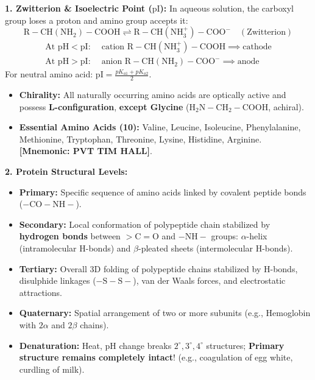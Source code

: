 \documentclass[10pt,twoside,openright]{book}
\begin{document}
\begin{formulabox}
\textbf{1. Zwitterion \& Isoelectric Point ($\mathrm{pI}$):}
In aqueous solution, the carboxyl group loses a proton and amino group accepts it:
\begin{equation}
  \mathrm{R-CH(NH_2)-COOH} \rightleftharpoons \mathrm{R-CH(NH_3^+)-COO^-} \quad (\text{Zwitterion})
\end{equation}
\begin{align}
  \text{At } \mathrm{pH} < \mathrm{pI}: &\text{ cation } \mathrm{R-CH(NH_3^+)-COOH} \implies \text{cathode} \\
  \text{At } \mathrm{pH} > \mathrm{pI}: &\text{ anion } \mathrm{R-CH(NH_2)-COO^-} \implies \text{anode}
\end{align}
For neutral amino acid: $\mathrm{pI} = \frac{pK_{a1} + pK_{a2}}{2}$.
\begin{itemize}
  \item \textbf{Chirality:} All naturally occurring amino acids are optically active and possess \textbf{L-configuration}, \textbf{except Glycine} ($\mathrm{H_2N-CH_2-COOH}$, achiral).
  \item \textbf{Essential Amino Acids (10):} Valine, Leucine, Isoleucine, Phenylalanine, Methionine, Tryptophan, Threonine, Lysine, Histidine, Arginine. \textbf{[Mnemonic: PVT TIM HALL]}.
\end{itemize}
\textbf{2. Protein Structural Levels:}
\begin{itemize}
  \item \textbf{Primary:} Specific sequence of amino acids linked by covalent peptide bonds ($-\mathrm{CO-NH}-$).
  \item \textbf{Secondary:} Local conformation of polypeptide chain stabilized by \textbf{hydrogen bonds} between $>\mathrm{C=O}$ and $-\mathrm{NH}-$ groups: $\alpha$-helix (intramolecular H-bonds) and $\beta$-pleated sheets (intermolecular H-bonds).
  \item \textbf{Tertiary:} Overall 3D folding of polypeptide chains stabilized by H-bonds, disulphide linkages ($-\mathrm{S-S}-$), van der Waals forces, and electrostatic attractions.
  \item \textbf{Quaternary:} Spatial arrangement of two or more subunits (e.g., Hemoglobin with $2\alpha$ and $2\beta$ chains).
  \item \textbf{Denaturation:} Heat, pH change breaks $2^\circ, 3^\circ, 4^\circ$ structures; \textbf{Primary structure remains completely intact}! (e.g., coagulation of egg white, curdling of milk).
\end{itemize}
\end{formulabox}
\end{document}
